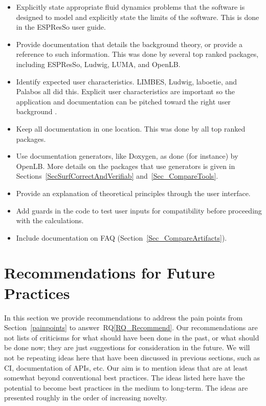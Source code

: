 \documentclass[final, 3p, times, authoryear]{elsarticle}
\newcommand{\rqref}[1]{RQ\ref{#1}}
\begin{document}
\begin{itemize}
	\item Explicitly state appropriate fluid dynamics problems that the software
	is designed to model and explicitly state the limits of the software. This
	is done in the ESPResSo user guide.
	\item Provide documentation that details the background theory, or provide a
	reference to such information. This was done by several top ranked packages,
	including ESPResSo, Ludwig, LUMA, and OpenLB.
	\item Identify expected user characteristics. LIMBES, Ludwig, laboetie, and
	Palabos all did this. Explicit user characteristics are important so the
	application and documentation can be pitched toward the right user
	background \citep{SmithEtAl2007}.
	\item Keep all documentation in one location. This was done by all top
	ranked packages.
	\item Use documentation generators, like Doxygen, as done (for instance) by
	OpenLB.  More details on the packages that use generators is given in
	Sections~\ref{SecSurfCorrectAndVerifiab} and~\ref{Sec_CompareTools}.
	\item Provide an explanation of theoretical principles through the user interface.
	\item Add guards in the code to test user inputs for compatibility before
	proceeding with the calculations.
	\item Include documentation on FAQ (Section~\ref{Sec_CompareArtifacts}).
\end{itemize}

\section{Recommendations for Future Practices} \label{Sec_Recommendations}

In this section we provide recommendations to address the pain points from
Section~\ref{painpoints} to answer~\rqref{RQ_Recommend}.  Our recommendations
are not lists of criticisms for what should have been done in the past, or what
should be done now; they are just suggestions for consideration in the future.
We will not be repeating ideas here that have been discussed in previous
sections, such as CI, documentation of APIs, etc.  Our aim
is to mention ideas that are at least somewhat beyond conventional best
practices. The ideas listed here have the potential to become best practices in
the medium to long-term. The ideas are presented roughly in the order of
increasing novelty.
\end{document}
